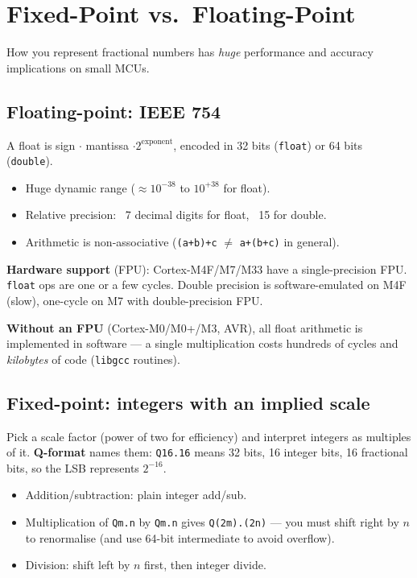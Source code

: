 \documentclass[11pt,a4paper]{article}
\begin{document}
\section{Fixed-Point vs.\ Floating-Point}

How you represent fractional numbers has \emph{huge} performance and
accuracy implications on small MCUs.

\subsection{Floating-point: IEEE 754}

A float is sign $\cdot$ mantissa $\cdot 2^{\text{exponent}}$, encoded in
32 bits (\texttt{float}) or 64 bits (\texttt{double}).
\begin{itemize}[leftmargin=*]
    \item Huge dynamic range ($\approx 10^{-38}$ to $10^{+38}$ for float).
    \item Relative precision: ~7 decimal digits for float, ~15 for double.
    \item Arithmetic is non-associative (\texttt{(a+b)+c} $\neq$
    \texttt{a+(b+c)} in general).
\end{itemize}

\textbf{Hardware support} (FPU): Cortex-M4F/M7/M33 have a single-precision
FPU. \texttt{float} ops are one or a few cycles. Double precision is
software-emulated on M4F (slow), one-cycle on M7 with double-precision FPU.

\textbf{Without an FPU} (Cortex-M0/M0+/M3, AVR), all float arithmetic is
implemented in software --- a single multiplication costs hundreds of cycles
and \emph{kilobytes} of code (\texttt{libgcc} routines).

\subsection{Fixed-point: integers with an implied scale}

Pick a scale factor (power of two for efficiency) and interpret integers
as multiples of it. \textbf{Q-format} names them: \texttt{Q16.16} means
32 bits, 16 integer bits, 16 fractional bits, so the LSB represents
$2^{-16}$.

\begin{itemize}[leftmargin=*]
    \item Addition/subtraction: plain integer add/sub.
    \item Multiplication of \texttt{Qm.n} by \texttt{Qm.n} gives
    \texttt{Q(2m).(2n)} --- you must shift right by $n$ to renormalise
    (and use 64-bit intermediate to avoid overflow).
    \item Division: shift left by $n$ first, then integer divide.
\end{itemize}
\end{document}

